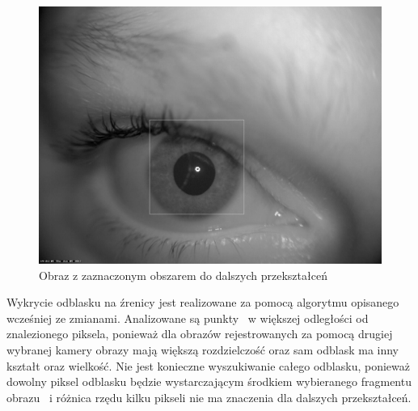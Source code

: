 \begin{figure}
\begin{center}
\includegraphics[scale=0.25]{obszar.jpg}
\caption{Obraz z zaznaczonym obszarem do dalszych przekształceń}
\label{fig:obszar}
\end{center}
\end{figure}

Wykrycie odblasku na źrenicy jest realizowane za pomocą algorytmu opisanego wcześniej ze zmianami. Analizowane są punkty ~w większej odległości od znalezionego piksela, ponieważ dla obrazów rejestrowanych za pomocą drugiej wybranej kamery obrazy mają większą rozdzielczość oraz sam odblask ma inny kształt oraz wielkość. Nie jest konieczne wyszukiwanie całego odblasku, ponieważ dowolny piksel odblasku będzie wystarczającym środkiem wybieranego fragmentu obrazu ~i różnica rzędu kilku pikseli nie ma znaczenia dla dalszych przekształceń.

